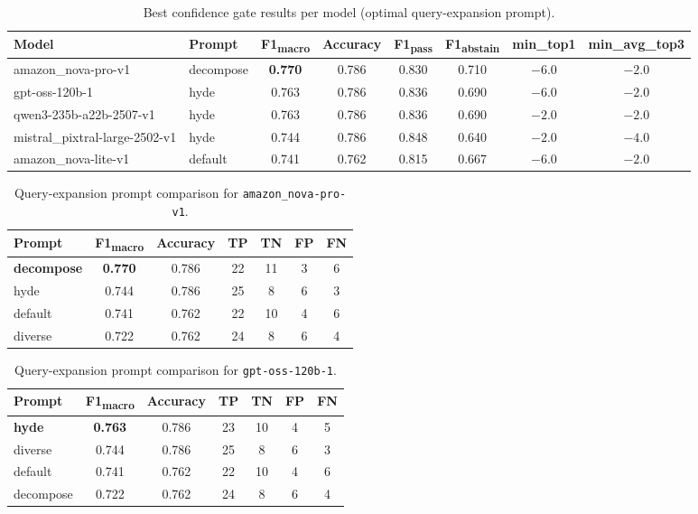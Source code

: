 \begin{table}[htbp]
\centering
\caption{Best confidence gate results per model (optimal query-expansion prompt).}
\label{tab:confidence-gate-best}
\begin{tabular}{llcccccc}
\toprule
Model & Prompt & F1\textsubscript{macro} & Accuracy & F1\textsubscript{pass} & F1\textsubscript{abstain} & min\_top1 & min\_avg\_top3 \\
\midrule
amazon\_nova-pro-v1        & decompose & \textbf{0.770} & 0.786 & 0.830 & 0.710 & $-6.0$ & $-2.0$ \\
gpt-oss-120b-1             & hyde      & 0.763          & 0.786 & 0.836 & 0.690 & $-6.0$ & $-2.0$ \\
qwen3-235b-a22b-2507-v1   & hyde      & 0.763          & 0.786 & 0.836 & 0.690 & $-2.0$ & $-2.0$ \\
mistral\_pixtral-large-2502-v1 & hyde  & 0.744          & 0.786 & 0.848 & 0.640 & $-2.0$ & $-4.0$ \\
amazon\_nova-lite-v1       & default   & 0.741          & 0.762 & 0.815 & 0.667 & $-6.0$ & $-2.0$ \\
\bottomrule
\end{tabular}
\end{table}



\begin{table}[htbp]
\centering
\caption{Query-expansion prompt comparison for \texttt{amazon\_nova-pro-v1}.}
\label{tab:cg-nova-pro}
\begin{tabular}{lcccccc}
\toprule
Prompt & F1\textsubscript{macro} & Accuracy & TP & TN & FP & FN \\
\midrule
\textbf{decompose} & \textbf{0.770} & 0.786 & 22 & 11 & 3 & 6 \\
hyde      & 0.744 & 0.786 & 25 &  8 & 6 & 3 \\
default   & 0.741 & 0.762 & 22 & 10 & 4 & 6 \\
diverse   & 0.722 & 0.762 & 24 &  8 & 6 & 4 \\
\bottomrule
\end{tabular}
\end{table}

\begin{table}[htbp]
\centering
\caption{Query-expansion prompt comparison for \texttt{gpt-oss-120b-1}.}
\label{tab:cg-gpt-oss}
\begin{tabular}{lcccccc}
\toprule
Prompt & F1\textsubscript{macro} & Accuracy & TP & TN & FP & FN \\
\midrule
\textbf{hyde} & \textbf{0.763} & 0.786 & 23 & 10 & 4 & 5 \\
diverse   & 0.744 & 0.786 & 25 &  8 & 6 & 3 \\
default   & 0.741 & 0.762 & 22 & 10 & 4 & 6 \\
decompose & 0.722 & 0.762 & 24 &  8 & 6 & 4 \\
\bottomrule
\end{tabular}
\end{table}

